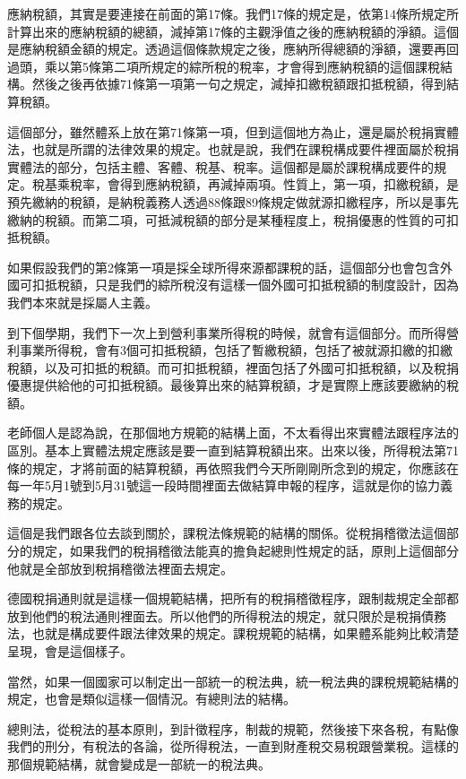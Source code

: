 \documentclass[oneside,sub3section]{ctexbook}
\begin{document}
應納稅額，其實是要連接在前面的第17條。我們17條的規定是，依第14條所規定所計算出來的應納稅額的總額，減掉第17條的主觀淨值之後的應納稅額的淨額。這個是應納稅額金額的規定。透過這個條款規定之後，應納所得總額的淨額，還要再回過頭，乘以第5條第二項所規定的綜所稅的稅率，才會得到應納稅額的這個課稅結構。然後之後再依據71條第一項第一句之規定，減掉扣繳稅額跟扣抵稅額，得到結算稅額。

這個部分，雖然體系上放在第71條第一項，但到這個地方為止，還是屬於稅捐實體法，也就是所謂的法律效果的規定。也就是說，我們在課稅構成要件裡面屬於稅捐實體法的部分，包括主體、客體、稅基、稅率。這個都是屬於課稅構成要件的規定。稅基乘稅率，會得到應納稅額，再減掉兩項。性質上，第一項，扣繳稅額，是預先繳納的稅額，是納稅義務人透過88條跟89條規定做就源扣繳程序，所以是事先繳納的稅額。而第二項，可抵減稅額的部分是某種程度上，稅捐優惠的性質的可扣抵稅額。

如果假設我們的第2條第一項是採全球所得來源都課稅的話，這個部分也會包含外國可扣抵稅額，只是我們的綜所稅沒有這樣一個外國可扣抵稅額的制度設計，因為我們本來就是採屬人主義。

到下個學期，我們下一次上到營利事業所得稅的時候，就會有這個部分。而所得營利事業所得稅，會有3個可扣抵稅額，包括了暫繳稅額，包括了被就源扣繳的扣繳稅額，以及可扣抵的稅額。而可扣抵稅額，裡面包括了外國可扣抵稅額，以及稅捐優惠提供給他的可扣抵稅額。最後算出來的結算稅額，才是實際上應該要繳納的稅額。

老師個人是認為說，在那個地方規範的結構上面，不太看得出來實體法跟程序法的區別。基本上實體法規定應該是要一直到結算稅額出來。出來以後，所得稅法第71條的規定，才將前面的結算稅額，再依照我們今天所剛剛所念到的規定，你應該在每一年5月1號到5月31號這一段時間裡面去做結算申報的程序，這就是你的協力義務的規定。

這個是我們跟各位去談到關於，課稅法條規範的結構的關係。從稅捐稽徵法這個部分的規定，如果我們的稅捐稽徵法能真的擔負起總則性規定的話，原則上這個部分他就是全部放到稅捐稽徵法裡面去規定。

德國稅捐通則就是這樣一個規範結構，把所有的稅捐稽徵程序，跟制裁規定全部都放到他們的稅法通則裡面去。所以他們的所得稅法的規定，就只限於是稅捐債務法，也就是構成要件跟法律效果的規定。課稅規範的結構，如果體系能夠比較清楚呈現，會是這個樣子。

當然，如果一個國家可以制定出一部統一的稅法典，統一稅法典的課稅規範結構的規定，也會是類似這樣一個情況。有總則法的結構。

總則法，從稅法的基本原則，到計徵程序，制裁的規範，然後接下來各稅，有點像我們的刑分，有稅法的各論，從所得稅法，一直到財產稅交易稅跟營業稅。這樣的那個規範結構，就會變成是一部統一的稅法典。
\end{document}
